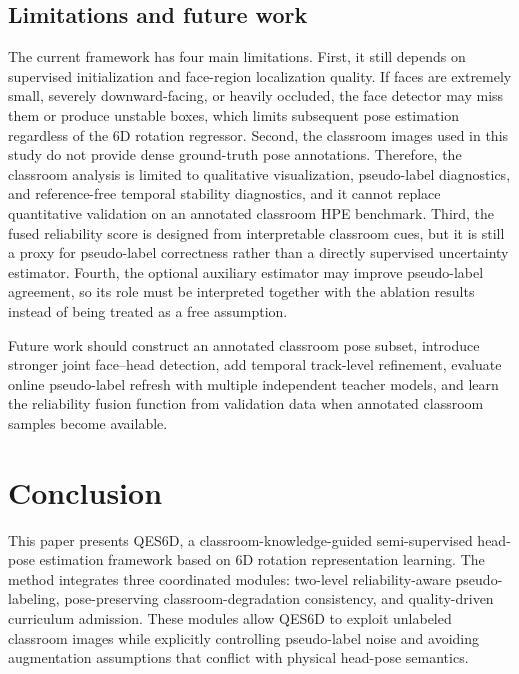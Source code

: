 \documentclass[preprint,12pt]{elsarticle}
\begin{document}
\subsection{Limitations and future work}
The current framework has four main limitations. First, it still depends on supervised initialization and face-region localization quality. If faces are extremely small, severely downward-facing, or heavily occluded, the face detector may miss them or produce unstable boxes, which limits subsequent pose estimation regardless of the 6D rotation regressor. Second, the classroom images used in this study do not provide dense ground-truth pose annotations. Therefore, the classroom analysis is limited to qualitative visualization, pseudo-label diagnostics, and reference-free temporal stability diagnostics, and it cannot replace quantitative validation on an annotated classroom HPE benchmark. Third, the fused reliability score is designed from interpretable classroom cues, but it is still a proxy for pseudo-label correctness rather than a directly supervised uncertainty estimator. Fourth, the optional auxiliary estimator may improve pseudo-label agreement, so its role must be interpreted together with the ablation results instead of being treated as a free assumption.

Future work should construct an annotated classroom pose subset, introduce stronger joint face--head detection, add temporal track-level refinement, evaluate online pseudo-label refresh with multiple independent teacher models, and learn the reliability fusion function from validation data when annotated classroom samples become available.

\section{Conclusion}
This paper presents QES6D, a classroom-knowledge-guided semi-supervised head-pose estimation framework based on 6D rotation representation learning. The method integrates three coordinated modules: two-level reliability-aware pseudo-labeling, pose-preserving classroom-degradation consistency, and quality-driven curriculum admission. These modules allow QES6D to exploit unlabeled classroom images while explicitly controlling pseudo-label noise and avoiding augmentation assumptions that conflict with physical head-pose semantics.
\end{document}
